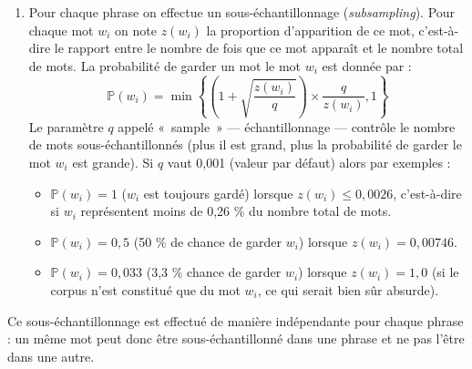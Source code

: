 \documentclass[11pt,french,french]{article}
\providecommand{\tightlist}{%
  \setlength{\parskip}{0pt}
  }
\begin{document}
\begin{enumerate}
\def\labelenumi{\arabic{enumi}.}
\item
  Pour chaque phrase on effectue un sous-échantillonnage
  (\emph{subsampling}). Pour chaque mot \(w_i\) on note \(z(w_i)\) la
  proportion d'apparition de ce mot, c'est-à-dire le rapport entre le
  nombre de fois que ce mot apparaît et le nombre total de mots. La
  probabilité de garder un mot le mot \(w_i\) est donnée par : \[
  \mathbb P(w_i) = \min\left\{\left(1+\sqrt{\frac{z(w_i)}{q}}  \right)
  \times
  \frac{q}{z(w_i)},1\right\}
  \] Le paramètre \(q\) appelé «~sample~» --- échantillonnage ---
  contrôle le nombre de mots sous-échantillonnés (plus il est grand,
  plus la probabilité de garder le mot \(w_i\) est grande). Si \(q\)
  vaut 0,001 (valeur par défaut) alors par exemples :

  \begin{itemize}
  \tightlist
  \item
    \(\mathbb P(w_i) = 1\) (\(w_i\) est toujours gardé) lorsque
    \(z(w_i)\leq 0,0026\), c'est-à-dire si \(w_i\) représentent moins de
    0,26 \% du nombre total de mots.\\
  \item
    \(\mathbb P(w_i) = 0,5\) (50 \% de chance de garder \(w_i\)) lorsque
    \(z(w_i)=0,00746\).\\
  \item
    \(\mathbb P(w_i) = 0,033\) (3,3 \% chance de garder \(w_i\)) lorsque
    \(z(w_i)=1,0\) (si le corpus n'est constitué que du mot \(w_i\), ce
    qui serait bien sûr absurde).
  \end{itemize}
\end{enumerate}

Ce sous-échantillonnage est effectué de manière indépendante pour chaque
phrase : un même mot peut donc être sous-échantillonné dans une phrase
et ne pas l'être dans une autre.
\end{document}
